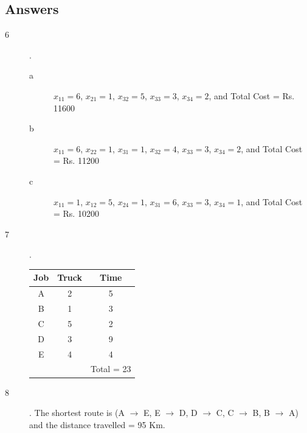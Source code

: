 \subsection{Answers}
\begin{description}
	\item [6]. \begin{description}
		\item [a] $x_{11} = 6$, $x_{21} = 1$, $x_{32} = 5$, $x_{33} = 3$, $x_{34} = 2$, and Total Cost = Rs. 11600
		\item [b] $x_{11} = 6$, $x_{22} = 1$, $x_{31} = 1$, $x_{32} = 4$, $x_{33} = 3$, $x_{34} = 2$, and Total Cost = Rs. 11200
		\item [c] $x_{11} = 1$, $x_{12} = 5$, $x_{24} = 1$, $x_{31} = 6$, $x_{33} = 3$, $x_{34} = 1$, and Total Cost = Rs. 10200
	\end{description}
	\item [7]. \begin{center}
		\begin{tabular}{| c | c | c |}
			\hline
			Job & Truck & Time\\
			\hline
			A & 2 & 5\\
			\hline
			B & 1 & 3\\ 
			\hline
			C & 5 & 2\\ 
			\hline
			D & 3 & 9\\ 
			\hline
			E & 4 & 4\\ 
			\hline
			& & Total = 23
		\end{tabular}
	\end{center}
	\item [8]. The shortest route is (A $\rightarrow$ E, E $\rightarrow$ D, D $\rightarrow$ C, C $\rightarrow$ B, B $\rightarrow$ A) and the distance travelled = 95 Km.
\end{description}
